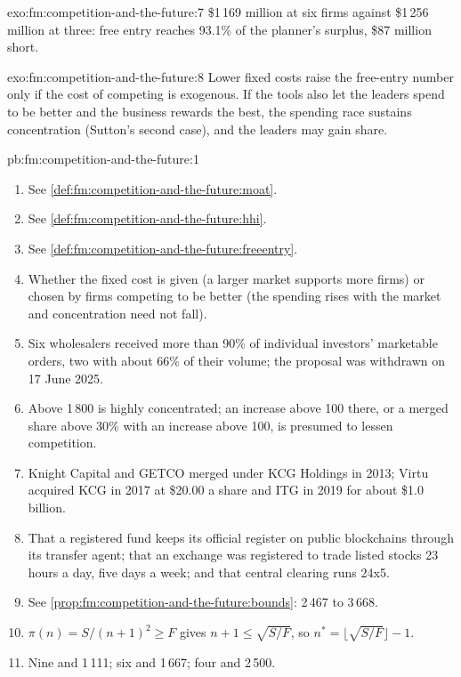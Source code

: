 \begin{solution}{exo:fm:competition-and-the-future:7}
\$1\,169 million at six firms against \$1\,256 million at three: free entry reaches 93.1\% of the planner's surplus, \$87 million short.
\end{solution}

\begin{solution}{exo:fm:competition-and-the-future:8}
Lower fixed costs raise the free-entry number only if the cost of competing is exogenous. If the tools also let the leaders spend to be better and
the business rewards the best, the spending race sustains concentration (Sutton's second case), and the leaders may gain share.
\end{solution}

\begin{solution}{pb:fm:competition-and-the-future:1}
\begin{enumerate}
\item See \cref{def:fm:competition-and-the-future:moat}.
\item See \cref{def:fm:competition-and-the-future:hhi}.
\item See \cref{def:fm:competition-and-the-future:freeentry}.
\item Whether the fixed cost is given (a larger market supports more firms) or chosen by firms competing to be better (the spending rises with the
market and concentration need not fall).
\item Six wholesalers received more than 90\% of individual investors' marketable orders, two with about 66\% of their volume; the proposal was
withdrawn on 17 June 2025.
\item Above 1\,800 is highly concentrated; an increase above 100 there, or a merged share above 30\% with an increase above 100, is presumed to lessen
competition.
\item Knight Capital and GETCO merged under KCG Holdings in 2013; Virtu acquired KCG in 2017 at \$20.00 a share and ITG in 2019 for about \$1.0 billion.
\item That a registered fund keeps its official register on public blockchains through its transfer agent; that an exchange was registered to trade
listed stocks 23 hours a day, five days a week; and that central clearing runs 24x5.
\item See \cref{prop:fm:competition-and-the-future:bounds}: 2\,467 to 3\,668.
\item $\pi(n)=S/(n+1)^2\ge F$ gives $n+1\le\sqrt{S/F}$, so $n^*=\lfloor\sqrt{S/F}\rfloor-1$.
\item Nine and 1\,111; six and 1\,667; four and 2\,500.

\end{enumerate}
\end{solution}

